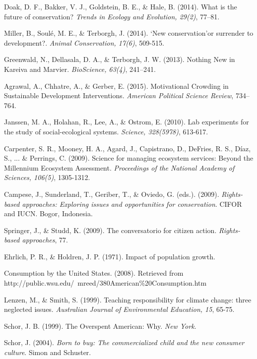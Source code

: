 \documentclass[rutwik_proposal.tex]{subfiles}
\begin{document}
\begin{thebibliography}{100}
Doak, D. F., Bakker, V. J., Goldstein, B. E., \& Hale, B. 
(2014). 
What is the future of conservation? 
\emph{Trends in Ecology and Evolution, 29(2)}, 
77–81.

Miller, B., Soulé, M. E., \& Terborgh, J. 
(2014). 
‘New conservation’or surrender to development?. 
\emph{Animal Conservation, 17(6)}, 
509-515.

Greenwald, N., Dellasala, D. A., \& Terborgh, J. W. 
(2013). 
Nothing New in Kareiva and Marvier. 
\emph{BioScience, 63(4)}, 
241–241.

Agrawal, A., Chhatre, A., \& Gerber, E. 
(2015). 
Motivational Crowding in Sustainable Development Interventions. 
\emph{American Political Science Review}, 
734–764.

Janssen, M. A., Holahan, R., Lee, A., \& Ostrom, E. 
(2010). 
Lab experiments for the study of social-ecological systems. 
\emph{Science, 328(5978)}, 
613-617.

Carpenter, S. R., Mooney, H. A., Agard, J., Capistrano, D., DeFries, R. S., Díaz, S., ... \& Perrings, C. 
(2009). 
Science for managing ecosystem services: Beyond the Millennium Ecosystem Assessment. 
\emph{Proceedings of the National Academy of Sciences, 106(5)}, 
1305-1312.

Campese, J., Sunderland, T., Geriber, T., \& Oviedo, G. (eds.).
(2009).
\emph{Rights-based approaches: Exploring issues and opportunities for conservation}.
CIFOR and IUCN.
Bogor, Indonesia.

Springer, J., \& Studd, K. 
(2009). 
The conversatorio for citizen action. 
\emph{Rights-based approaches}, 
77.

Ehrlich, P. R., \& Holdren, J. P. 
(1971). 
Impact of population growth.

Consumption by the United States.
(2008).
Retrieved from \\http://public.wsu.edu/~mreed/380American\%20Consumption.htm

Lenzen, M., \& Smith, S. 
(1999). 
Teaching responsibility for climate change: three neglected issues. 
\emph{Australian Journal of Environmental Education, 15}, 
65-75.

Schor, J. B. 
(1999). 
The Overspent American: Why. 
\emph{New York}.

Schor, J. 
(2004). 
\emph{Born to buy: The commercialized child and the new consumer culture}. 
Simon and Schuster.


\end{thebibliography}
\end{document}
